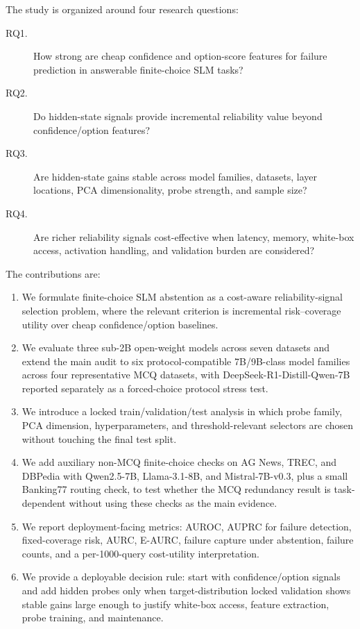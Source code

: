 \documentclass[preprint,12pt,authoryear]{elsarticle}
\begin{document}
The study is organized around four research questions:
\begin{description}
    \item[RQ1.] How strong are cheap confidence and option-score features for failure prediction in answerable finite-choice SLM tasks?
    \item[RQ2.] Do hidden-state signals provide incremental reliability value beyond confidence/option features?
    \item[RQ3.] Are hidden-state gains stable across model families, datasets, layer locations, PCA dimensionality, probe strength, and sample size?
    \item[RQ4.] Are richer reliability signals cost-effective when latency, memory, white-box access, activation handling, and validation burden are considered?
\end{description}

The contributions are:

\begin{enumerate}
    \item We formulate finite-choice SLM abstention as a cost-aware reliability-signal selection problem, where the relevant criterion is incremental risk--coverage utility over cheap confidence/option baselines.
    \item We evaluate three sub-2B open-weight models across seven datasets and extend the main audit to six protocol-compatible 7B/9B-class model families across four representative MCQ datasets, with DeepSeek-R1-Distill-Qwen-7B reported separately as a forced-choice protocol stress test.
    \item We introduce a locked train/validation/test analysis in which probe family, PCA dimension, hyperparameters, and threshold-relevant selectors are chosen without touching the final test split.
    \item We add auxiliary non-MCQ finite-choice checks on AG News, TREC, and DBPedia with Qwen2.5-7B, Llama-3.1-8B, and Mistral-7B-v0.3, plus a small Banking77 routing check, to test whether the MCQ redundancy result is task-dependent without using these checks as the main evidence.
    \item We report deployment-facing metrics: AUROC, AUPRC for failure detection, fixed-coverage risk, AURC, E-AURC, failure capture under abstention, failure counts, and a per-1000-query cost-utility interpretation.
    \item We provide a deployable decision rule: start with confidence/option signals and add hidden probes only when target-distribution locked validation shows stable gains large enough to justify white-box access, feature extraction, probe training, and maintenance.
\end{enumerate}
\end{document}
